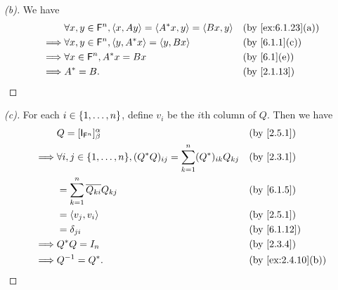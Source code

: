 \begin{proof}[(b)]
  We have
  \begin{align*}
             & \forall x, y \in \vs{F}^n, \inn{x, Ay} = \inn{A^* x, y} = \inn{Bx, y} &  & \by{ex:6.1.23}[a] \\
    \implies & \forall x, y \in \vs{F}^n, \inn{y, A^* x} = \inn{y, Bx}               &  & \by{6.1.1}[c]     \\
    \implies & \forall x \in \vs{F}^n, A^* x = Bx                                    &  & \by{6.1}[e]       \\
    \implies & A^* = B.                                                              &  & \by{2.1.13}
  \end{align*}
\end{proof}

\begin{proof}[(c)]
  For each \(i \in \left\lbrace1, \dots, n\right\rbrace\), define \(v_i\) be the \(i\)th column of \(Q\).
  Then we have
  \begin{align*}
             & Q = [\IT[\vs{F}^n]]_{\beta}^{\alpha}                                                   &  & \by{2.5.1}        \\
    \implies & \forall i, j \in \set{1, \dots, n}, (Q^* Q)_{i j} = \sum_{k = 1}^n (Q^*)_{i k} Q_{k j} &  & \by{2.3.1}        \\
             & = \sum_{k = 1}^n \conj{Q_{k i}} Q_{k j}                                                &  & \by{6.1.5}        \\
             & = \inn{v_j, v_i}                                                                       &  & \by{2.5.1}        \\
             & = \delta_{j i}                                                                         &  & \by{6.1.12}       \\
    \implies & Q^* Q = I_n                                                                            &  & \by{2.3.4}        \\
    \implies & Q^{-1} = Q^*.                                                                          &  & \by{ex:2.4.10}[b]
  \end{align*}
\end{proof}

